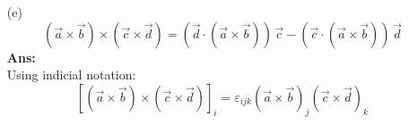 \documentclass[a4paper,12pt]{article}
\begin{document}
\begin{enumerate}
\vspace{5pt}

\textbf Use the relation: 
\[\boxed{
\varepsilon_{ijk} \varepsilon_{imn} = \delta_{jm} \delta_{kn} - \delta_{jn} \delta_{km}},
\]

where \(\delta_{ij}\) is the Kronecker delta.

\vspace{5pt}

\textbf Substitute this identity:
\[
\begin{aligned}
(\vec{a} \times \vec{b}) \cdot (\vec{c} \times \vec{d}) 
&= (\delta_{jm} \delta_{kn} - \delta_{jn} \delta_{km}) a_j b_k c_m d_n \\
&= \delta_{jm} \delta_{kn} \, a_j b_k c_m d_n - \delta_{jn} \delta_{km} \, a_j b_k c_m d_n
\end{aligned}
\]



\vspace{5pt}

\textbf Apply the properties of the Kronecker delta:

\[
= a_m b_n c_m d_n - a_n b_m c_m d_n,
\]
\textbf{Since} \quad
{}
\quad {}


\vspace{5pt}

\textbf Then:
\[
= (\vec{a} \cdot \vec{c})(\vec{b} \cdot \vec{d}) - (\vec{b} \cdot \vec{c})(\vec{a} \cdot \vec{d}).
\]

\vspace{10pt}

\textbf{Therefore,}
\[
\boxed{
(\vec{a} \times \vec{b}) \cdot (\vec{c} \times \vec{d}) = (\vec{a} \cdot \vec{c})(\vec{b} \cdot \vec{d}) - (\vec{b} \cdot \vec{c})(\vec{a} \cdot \vec{d}).
}
\]





\item[(e)]\[(\vec{a} \times \vec{b}) \times (\vec{c} \times \vec{d}) = (\vec{d} \cdot (\vec{a} \times \vec{b}))\, \vec{c} - (\vec{c} \cdot (\vec{a} \times \vec{b}))\, \vec{d}
\]
\textbf{Ans:}\\
Using indicial notation:
\[
[(\vec{a} \times \vec{b}) \times (\vec{c} \times \vec{d})]_i = \varepsilon_{ijk} (\vec{a} \times \vec{b})_j (\vec{c} \times \vec{d})_k
\]


\end{enumerate}
\end{document}
